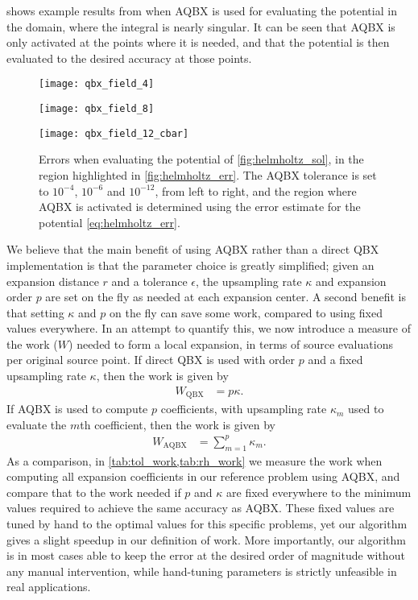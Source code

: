 \documentclass[hidelinks]{siamart1116}
\begin{document}
 shows example results from when AQBX is
used for evaluating the potential in the domain, where the integral is
nearly singular. It can be seen that AQBX is only activated at the
points where it is needed, and that the potential is then evaluated to
the desired accuracy at those points.
\begin{figure}[htbp]
  
  \centering
  \begin{minipage}{0.28\textwidth}
      \texttt{[image: qbx\_field\_4]}
  \end{minipage}
  \begin{minipage}{0.28\linewidth}
      \texttt{[image: qbx\_field\_8]}
  \end{minipage}
  \begin{minipage}{0.41\linewidth}
      \texttt{[image: qbx\_field\_12\_cbar]}
  \end{minipage}
  \caption{Errors when evaluating the potential of
    \cref{fig:helmholtz_sol}, in the region highlighted in
    \cref{fig:helmholtz_err}. The AQBX tolerance is set to $10^{-4}$,
    $10^{-6}$ and $10^{-12}$, from left to right, and the region where
    AQBX is activated is determined using the error estimate for the
    potential \eqref{eq:helmholtz_err}.}
  \label{fig:corrected_field}
\end{figure}

We believe that the main benefit of using AQBX rather than a direct
QBX implementation is that the parameter choice is greatly simplified;
given an expansion distance $r$ and a tolerance ${\epsilon}$, the upsampling
rate ${\kappa}$ and expansion order $p$ are set on the fly as needed at
each expansion center. A second benefit is that setting ${\kappa}$ and
$p$ on the fly can save some work, compared to using fixed values
everywhere. In an attempt to quantify this, we now introduce a measure
of the work (${{W}}$) needed to form a local expansion, in terms of
source evaluations per original source point. If direct QBX is used
with order $p$ and a fixed upsampling rate ${\kappa}$, then the work is
given by
\begin{align}
    {{W}}_{\text{QBX}} &= p {\kappa}.
\end{align}
If AQBX is used to compute $p$ coefficients, with upsampling rate
${\kappa}_m$ used to evaluate the $m$th coefficient, then the work is
given by
\begin{align}
  {{W}}_{\text{AQBX}} &= \sum_{m=1}^p {\kappa}_m .
\end{align}
As a comparison, in \cref{tab:tol_work,tab:rh_work} we measure the
work when computing all expansion coefficients in our reference
problem using AQBX, and compare that to the work needed if $p$ and
${\kappa}$ are fixed everywhere to the minimum values required to
achieve the same accuracy as AQBX. These fixed values are tuned by
hand to the optimal values for this specific problems, yet our
algorithm gives a slight speedup in our definition of work. More
importantly, our algorithm is in most cases able to keep the error at
the desired order of magnitude without any manual intervention, while
hand-tuning parameters is strictly unfeasible in real applications.
\end{document}
